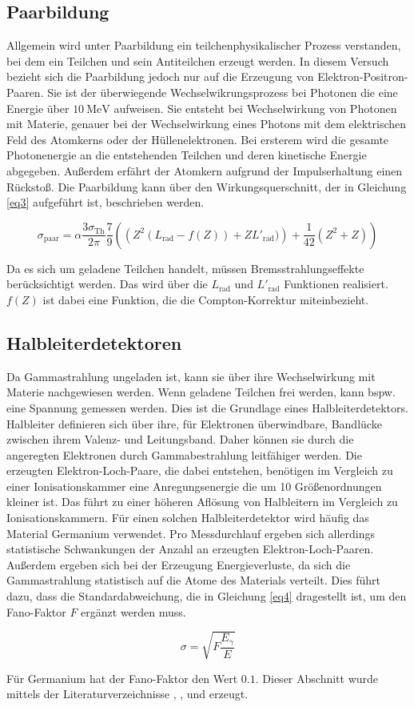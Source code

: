 \subsection{Paarbildung}
Allgemein wird unter Paarbildung ein teilchenphysikalischer Prozess verstanden, bei dem 
ein Teilchen und sein Antiteilchen erzeugt werden. In diesem Versuch bezieht sich die 
Paarbildung jedoch nur auf die Erzeugung von Elektron-Positron-Paaren. 
Sie ist der überwiegende Wechselwikrungsprozess bei Photonen die eine Energie
über $\SI{10}{\mega\electronvolt}$ aufweisen.
Sie entsteht bei Wechselwirkung von Photonen mit Materie, genauer bei der 
Wechselwirkung eines Photons mit dem elektrischen Feld des Atomkerns oder der 
Hüllenelektronen. 
Bei ersterem wird die gesamte Photonenergie an die 
entstehenden Teilchen und deren kinetische Energie abgegeben. Außerdem erfährt 
der Atomkern aufgrund der Impulserhaltung einen Rückstoß.
Die Paarbildung kann über den 
Wirkungsquerschnitt, der in Gleichung \ref{eq3} aufgeführt ist, beschrieben werden.

\begin{equation}
    \sigma_{\text{paar}} = \alpha \frac{3 \sigma_{\text{Th}}}{2 \pi} \frac{7}{9} \left( \left( Z^2 (L_{\text{rad}} - f(Z)) + Z L'_{\text{rad}}) \right) + \frac{1}{42} \left(Z^2 + Z \right) \right)
    \label{eq3}
\end{equation}

Da es sich um geladene Teilchen handelt, müssen Bremsstrahlungseffekte berücksichtigt 
werden. Das wird über die $L_{\text{rad}}$ und $L'_{\text{rad}}$ Funktionen realisiert. 
$f(Z)$ ist dabei eine Funktion, die die Compton-Korrektur miteinbezieht.

\subsection{Halbleiterdetektoren}
Da Gammastrahlung ungeladen ist, kann sie über ihre Wechselwirkung mit Materie 
nachgewiesen werden. Wenn geladene Teilchen frei werden, kann bspw. eine 
Spannung gemessen werden. Dies ist die Grundlage eines Halbleiterdetektors.
Halbleiter definieren sich über ihre, für Elektronen überwindbare,
Bandlücke zwischen ihrem Valenz- und Leitungsband. Daher können sie durch die 
angeregten Elektronen durch Gammabestrahlung leitfähiger werden. 
Die erzeugten Elektron-Loch-Paare, die dabei entstehen, benötigen im Vergleich zu einer 
Ionisationskammer eine Anregungsenergie die um 10 Größenordnungen kleiner ist. 
Das führt zu einer höheren Aflösung von Halbleitern im Vergleich zu Ionisationskammern.
Für einen solchen Halbleiterdetektor wird häufig das Material Germanium verwendet.
Pro Messdurchlauf ergeben sich allerdings statistische Schwankungen der Anzahl an 
erzeugten Elektron-Loch-Paaren. Außerdem ergeben sich bei der Erzeugung Energieverluste,
da sich die Gammastrahlung statistisch auf die Atome des Materials verteilt.
Dies führt dazu, dass die Standardabweichung, die in Gleichung \ref{eq4} dragestellt ist,
um den Fano-Faktor $F$ ergänzt werden muss.

\begin{equation}
    \sigma = \sqrt{F \frac{E_{\gamma}}{E}}
    \label{eq4}
\end{equation}

Für Germanium hat der Fano-Faktor den Wert $\num{0,1}$.
Dieser Abschnitt wurde mittels der Literaturverzeichnisse \cite{lit1},
\cite{lit2}, \cite{lit3} und \cite{lit4} erzeugt.
